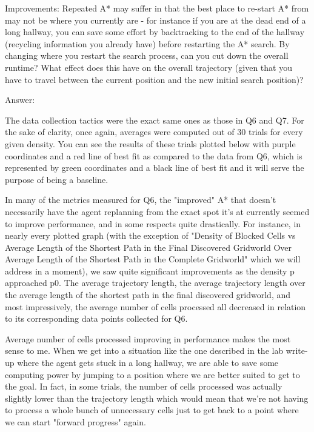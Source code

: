 \documentclass{homeworg}
\begin{document}
\newpage
\exercise*
Improvements: Repeated A* may suffer in that the best place to re-start A* from may not be where you currently are - for instance if you are at the dead end of a long hallway, you can save some effort by backtracking to the end of the hallway (recycling information you already have) before restarting the A* search. By changing where you restart the search process, can you cut down the overall runtime? What effect does this have on the overall trajectory (given that you have to travel between the current position and the new initial search position)?

Answer:

The data collection tactics were the exact same ones as those in Q6 and Q7. For the sake of clarity, once again, averages were computed out of 30 trials for every given density. You can see the results of these trials plotted below with purple coordinates and a red line of best fit as compared to the data from Q6, which is represented by green coordinates and a black line of best fit and it will serve the purpose of being a baseline.

In many of the metrics measured for Q6, the "improved" A* that doesn't necessarily have the agent replanning from the exact spot it's at currently seemed to improve performance, and in some respects quite drastically. For instance, in nearly every plotted graph (with the exception of "Density of Blocked Cells vs Average Length of the Shortest Path in the Final Discovered Gridworld Over Average Length of the Shortest Path in the Complete Gridworld" which we will address in a moment), we saw quite significant improvements as the density p approached p0. The average trajectory length, the average trajectory length over the average length of the shortest path in the final discovered gridworld, and most impressively, the average number of cells processed all decreased in relation to its corresponding data points collected for Q6.

Average number of cells processed improving in performance makes the most sense to me. When we get into a situation like the one described in the lab write-up where the agent gets stuck in a long hallway, we are able to save some computing power by jumping to a position where we are better suited to get to the goal. In fact, in some trials, the number of cells processed was actually slightly lower than the trajectory length which would mean that we're not having to process a whole bunch of unnecessary cells just to get back to a point where we can start "forward progress" again.
\end{document}
